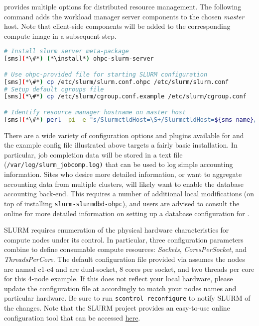 \OHPC{} provides multiple options for distributed resource management. 
The following command adds the \SLURM{} workload manager server components to the
chosen {\em master} host. Note that client-side components will be added to
the corresponding compute image in a subsequent step.

\begin{lstlisting}[language=bash,keywords={}]
# Install slurm server meta-package
[sms](*\#*) (*\install*) ohpc-slurm-server

# Use ohpc-provided file for starting SLURM configuration
[sms](*\#*) cp /etc/slurm/slurm.conf.ohpc /etc/slurm/slurm.conf
# Setup default cgroups file
[sms](*\#*) cp /etc/slurm/cgroup.conf.example /etc/slurm/cgroup.conf

# Identify resource manager hostname on master host
[sms](*\#*) perl -pi -e "s/SlurmctldHost=\S+/SlurmctldHost=${sms_name}/" /etc/slurm/slurm.conf
\end{lstlisting}

There are a wide variety of configuration options and plugins available
for \SLURM{} and the example config file illustrated above targets a fairly
basic installation. In particular, job completion data will be stored in a text
file (\texttt{/var/log/slurm\_jobcomp.log)} that can be used to log simple
accounting information. Sites who desire more detailed information, or want to
aggregate accounting data from multiple clusters, will likely want to enable the
database accounting back-end.  This requires a number of additional local modifications
(on top of installing \texttt{slurm-slurmdbd-ohpc}), and users are advised to
consult the online \href{https://slurm.schedmd.com/accounting.html}{\color{blue}{documentation}}
for more detailed information on setting up a database configuration for \SLURM{}.

\begin{center}
\begin{tcolorbox}[]
  \small SLURM requires enumeration of the physical hardware characteristics for
  compute nodes under its control. In particular, three configuration parameters
  combine to define consumable compute resources: {\em Sockets}, {\em
  CoresPerSocket}, and {\em ThreadsPerCore}. The default configuration file
  provided via \OHPC{} assumes the nodes are named c1-c4 and are dual-socket, 8
  cores per socket, and two threads per core for this 4-node example. If this
  does not reflect your local hardware, please update the configuration file at
   accordingly to match your nodes names and
  particular hardware. Be sure to run \texttt{scontrol reconfigure} to notify
  SLURM of the changes. Note that the SLURM project provides an easy-to-use
  online configuration tool that can be accessed
  \href{https://slurm.schedmd.com/configurator.html}{\color{blue} here}.
\end{tcolorbox}
\end{center}

